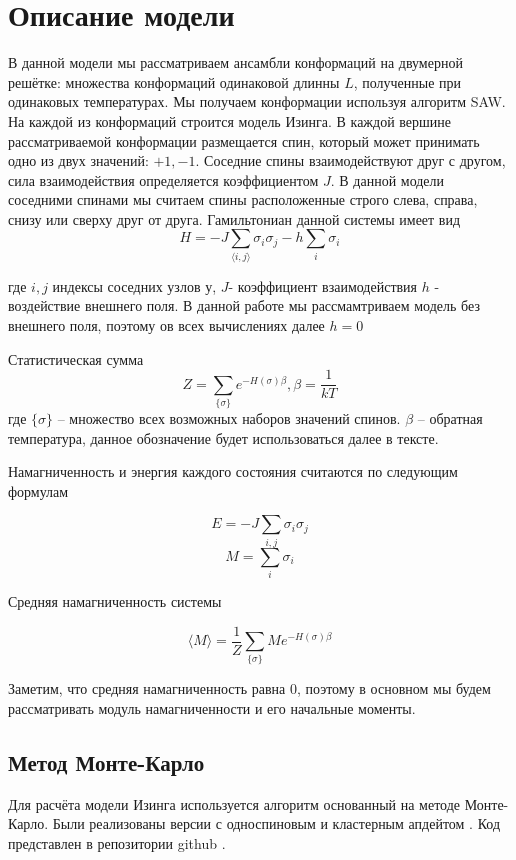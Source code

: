 \section{Описание модели}

В данной модели мы рассматриваем ансамбли конформаций на двумерной решётке: множества конформаций одинаковой длинны $L$, полученные при одинаковых температурах. Мы получаем конформации используя алгоритм SAW.
На каждой из конформаций строится модель Изинга. В каждой вершине рассматриваемой конформации размещается спин, который может принимать одно из двух значений: $+1, -1$. Соседние спины взаимодействуют друг с другом, сила взаимодействия определяется коэффициентом $J$. В данной модели соседними спинами мы считаем спины расположенные строго слева, справа, снизу или сверху друг от друга.
Гамильтониан данной системы имеет вид
\[H = -J\sum_{\langle i, j\rangle}{\sigma_i\sigma_j} - h\sum_i{\sigma_i} \]

где $i, j$ индексы соседних узлов у, $J$- коэффициент взаимодействия $h$ - воздействие внешнего поля. В данной работе мы рассмамтриваем модель без внешнего поля, поэтому ов всех вычислениях далее $h = 0$ 

Статистическая сумма
\[Z = \sum_{\{\sigma\}} e^{-H(\sigma)\beta}, \beta = \frac{1}{kT}\]
где $\{\sigma\}$ -- множество всех возможных наборов значений спинов. $\beta$ -- обратная температура, данное обозначение будет использоваться далее в тексте.

Намагниченность и энергия каждого состояния считаются по следующим формулам

\[ 
E = -J\sum_{i, j} \sigma_i \sigma_j
\]
\[
M = \sum_i \sigma_i
\]

Средняя намагниченность системы

\[
\langle M \rangle = \frac{1}{Z}  \sum_{\{\sigma\}} M e^{-H(\sigma)\beta}
\]

Заметим, что средняя намагниченность равна 0, поэтому в основном мы будем рассматривать модуль намагниченности и его начальные моменты.


\subsection{Метод Монте-Карло}
Для расчёта модели Изинга используется алгоритм основанный на методе Монте-Карло. Были реализованы версии с односпиновым и кластерным апдейтом \cite{wolf_algorithm}. Код представлен в репозитории github \cite{github}. 

